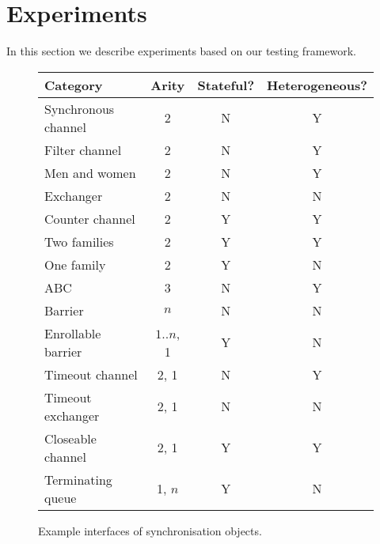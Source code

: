\section{Experiments}
\label{sec:experiments}

In this section we describe experiments based on our testing framework. 


\begin{figure}
\begin{center}
\begin{tabular}{lccc}
Category            & Arity & Stateful? & Heterogeneous? \\ \hline
Synchronous channel & 2     & N         & Y \\
Filter channel      & 2     & N         & Y \\
Men and women        & 2     & N         & Y \\
Exchanger           & 2     & N         & N \\
Counter channel     & 2     & Y         & Y \\
Two families        & 2     & Y         & Y \\
One family          & 2     & Y         & N \\
ABC                 & 3     & N         & Y \\
Barrier             & $n$   & N         & N \\
Enrollable barrier  & $1\mathord{..} n$, 1 & Y & N \\
Timeout channel     & 2, 1  & N         & Y \\
Timeout exchanger   & 2, 1  & N         & N \\
Closeable channel   & 2, 1  & Y         & Y \\
Terminating queue   & 1, $n$ & Y        & N  
\end{tabular}
\end{center}
\caption{Example interfaces of synchronisation objects.  \label{fig:examples}}
\end{figure}



